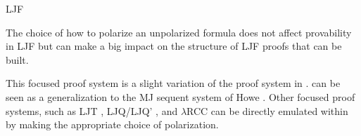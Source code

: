 \begin{entry}{LJF}
\begin{clarifications}
The choice of how to polarize an
unpolarized formula does not affect provability in LJF but can make a
big impact on the structure of LJF proofs that can be built.  
\end{clarifications}

\begin{history}
This focused proof system is a slight variation of the proof system in
\cite{liang09tcs,liang07csl}.  
\LJF can be seen as a generalization to the MJ sequent system of Howe
\cite{howe98phd}. 
Other focused proof systems, such as LJT \cite{herbelin95phd},
LJQ/LJQ' \cite{dyckhoff06cie}, and $\lambda$RCC
\cite{jagadeesan05fsttcs} can be directly emulated within \LJF by
making the appropriate choice of polarization.
\end{history}












\end{entry}

